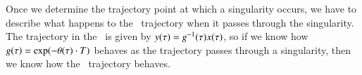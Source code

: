 Once we determine the trajectory point at which
a singularity occurs, we have to describe what happens to the \reducedsp\ trajectory when it passes through the singularity. The trajectory in the \reducedsp\ is given by $y(\tau)=g^{-1}(\tau) x(\tau)$, so if we know how $g(\tau)=\exp({-{\bf \theta}(\tau) \cdot T})$ behaves as the trajectory passes through a singularity, then we know how the \reducedsp\ trajectory behaves.






